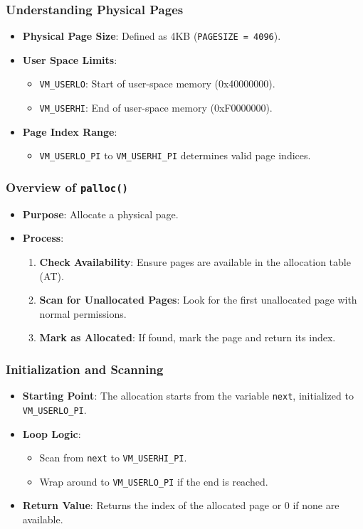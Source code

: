 \documentclass{beamer}
\begin{document}
	\begin{frame}
		\frametitle{Understanding Physical Pages}
		\begin{itemize}
			\item \textbf{Physical Page Size}: Defined as 4KB (\texttt{PAGESIZE = 4096}).
			\item \textbf{User Space Limits}:
			\begin{itemize}
				\item \texttt{VM\_USERLO}: Start of user-space memory (0x40000000).
				\item \texttt{VM\_USERHI}: End of user-space memory (0xF0000000).
			\end{itemize}
			\item \textbf{Page Index Range}: 
			\begin{itemize}
				\item \texttt{VM\_USERLO\_PI} to \texttt{VM\_USERHI\_PI} determines valid page indices.
			\end{itemize}
		\end{itemize}
	\end{frame}
	
	\begin{frame}
		\frametitle{Overview of \texttt{palloc()}}
		\begin{itemize}
			\item \textbf{Purpose}: Allocate a physical page.
			\item \textbf{Process}:
			\begin{enumerate}
				\item \textbf{Check Availability}: Ensure pages are available in the allocation table (AT).
				\item \textbf{Scan for Unallocated Pages}: Look for the first unallocated page with normal permissions.
				\item \textbf{Mark as Allocated}: If found, mark the page and return its index.
			\end{enumerate}
		\end{itemize}
	\end{frame}
	
	\begin{frame}
		\frametitle{Initialization and Scanning}
		\begin{itemize}
			\item \textbf{Starting Point}: The allocation starts from the variable \texttt{next}, initialized to \texttt{VM\_USERLO\_PI}.
			\item \textbf{Loop Logic}:
			\begin{itemize}
				\item Scan from \texttt{next} to \texttt{VM\_USERHI\_PI}.
				\item Wrap around to \texttt{VM\_USERLO\_PI} if the end is reached.
			\end{itemize}
			\item \textbf{Return Value}: Returns the index of the allocated page or 0 if none are available.
		\end{itemize}
	\end{frame}
	
\end{document}
